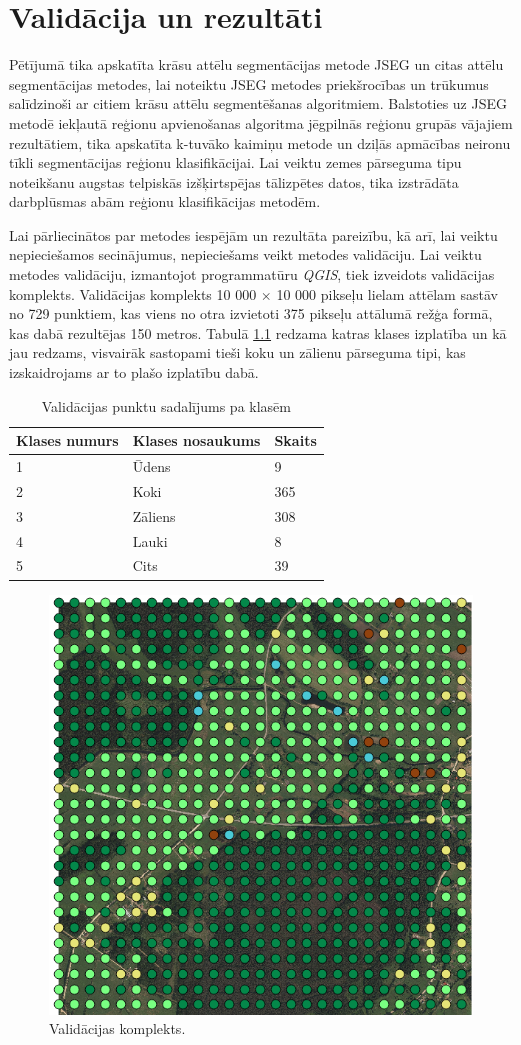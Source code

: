 \documentclass[12pt,paper=a4]{report}
\begin{document}
\chapter{Validācija un rezultāti}
Pētījumā tika apskatīta krāsu attēlu segmentācijas metode JSEG un citas attēlu segmentācijas metodes, lai noteiktu JSEG metodes priekšrocības un trūkumus salīdzinoši ar citiem krāsu attēlu segmentēšanas algoritmiem. Balstoties uz JSEG metodē iekļautā reģionu apvienošanas algoritma jēgpilnās reģionu grupās vājajiem rezultātiem, tika apskatīta k-tuvāko kaimiņu metode un dziļās apmācības neironu tīkli segmentācijas reģionu klasifikācijai. Lai veiktu zemes pārseguma tipu noteikšanu augstas telpiskās izšķirtspējas tālizpētes datos, tika izstrādāta darbplūsmas abām reģionu klasifikācijas metodēm.\par
Lai pārliecinātos par metodes iespējām un rezultāta pareizību, kā arī, lai veiktu nepieciešamos secinājumus, nepieciešams veikt metodes validāciju. Lai veiktu metodes validāciju, izmantojot programmatūru \textit{QGIS}, tiek izveidots validācijas komplekts. Validācijas komplekts 10 000 $\times$ 10 000 pikseļu  lielam attēlam sastāv no 729 punktiem, kas viens no otra izvietoti 375 pikseļu attālumā režģa formā, kas dabā rezultējas 150 metros. Tabulā \ref{tab:valPunkti} redzama katras klases izplatība un kā jau redzams, visvairāk sastopami tieši koku un zālienu pārseguma tipi, kas izskaidrojams ar to plašo izplatību dabā.
\begin{table}[!ht]
\centering
\caption{Validācijas punktu sadalījums pa klasēm}
\label{tab:valPunkti}
\begin{tabular}{|l|l|l|}
\hline
Klases numurs&Klases nosaukums& Skaits\\ \hline \hline
1&Ūdens&9 \\ \hline
2&Koki & 365\\ \hline
3&Zāliens & 308\\ \hline
4&Lauki & 8\\ \hline
5&Cits & 39\\ \hline
\end{tabular}
\end{table}\par
\begin{figure}[h!]
\centering
\includegraphics[width=.5\textwidth]{validacija}
\caption{Validācijas komplekts.}
\label{fig:validacija}
\end{figure}\par
\end{document}
